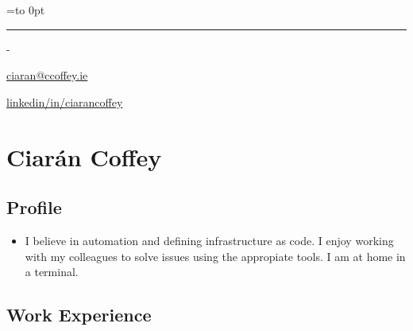 \documentclass[]{article}
\date{}
\providecommand{\tightlist}{%
  \setlength{\itemsep}{0pt}\setlength{\parskip}{0pt}}
\newenvironment{nospace}
  {\par\edef\theprevdepth{\the\prevdepth}\nointerlineskip
   \setbox\zerobox=\vtop to 0pt\bgroup
   \hrule height0pt\kern\dimexpr\baselineskip-\topskip\relax
  }
  {\par\vss\egroup\ht\zerobox=0pt \wd\zerobox=0pt \dp\zerobox=0pt
   \box\zerobox}
\begin{document}
\begin{nospace}\begin{flushright}
\vspace{-2em}\href{mailto:ciaran@ccoffey.ie}{ciaran@ccoffey.ie}

\href{http://linkedin.com/in/ciarancoffey}{linkedin/in/ciarancoffey}
\end{flushright}\end{nospace}

\section{Ciarán Coffey}\label{ciaruxe1n-coffey}

\subsection{Profile}\label{profile}

\begin{itemize}
\tightlist
\item
  I believe in automation and defining infrastructure as code. I enjoy
  working with my colleagues to solve issues using the appropiate tools.
  I am at home in a terminal.
\end{itemize}

\subsection{Work Experience}\label{work-experience}
\end{document}
